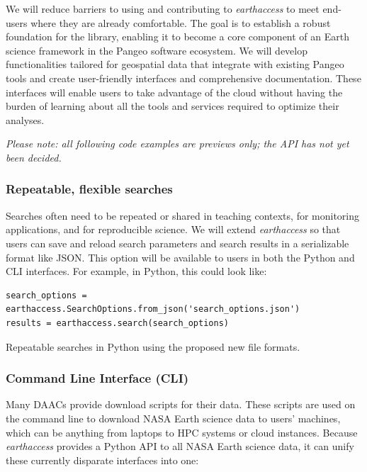 \documentclass{ROSES-NASA-proposal}
\newcommand{\earthaccess}{\textit{earthaccess}\xspace} %
\begin{document}
We will reduce barriers to using and contributing to \earthaccess to meet end-users where they are already comfortable. The goal is to establish a robust foundation for the library, enabling it to become a core component of an Earth science framework in the Pangeo software ecosystem. We will develop functionalities tailored for geospatial data that integrate with existing Pangeo tools and create user-friendly interfaces and comprehensive documentation. These interfaces will enable users to take advantage of the cloud without having the burden of learning about all the tools and services required to optimize their analyses.


\textit{Please note: all following code examples are previews only; the API has not yet been decided.}


\subsubsection{Repeatable, flexible searches} \label{repatable_searches}

Searches often need to be repeated or shared in teaching contexts, for monitoring applications, and for reproducible science. We will extend \earthaccess so that users can save and reload search parameters and search results in a serializable format like JSON. This option will be available to users in both the Python and CLI interfaces. For example, in Python, this could look like:

\begin{listing}[H]
\begin{verbatim}
search_options = earthaccess.SearchOptions.from_json('search_options.json')
results = earthaccess.search(search_options)
\end{verbatim}
\caption{Repeatable searches in Python using the proposed new file formats.}
\label{listing:2}
\end{listing}


\subsubsection{Command Line Interface (CLI)} \label{cli}

Many DAACs provide download scripts for their data. These scripts are used on the command line to download NASA Earth science data to users' machines, which can be anything from laptops to HPC systems or cloud instances. Because \earthaccess provides a Python API to all NASA Earth science data, it can unify these currently disparate interfaces into one:
\end{document}
